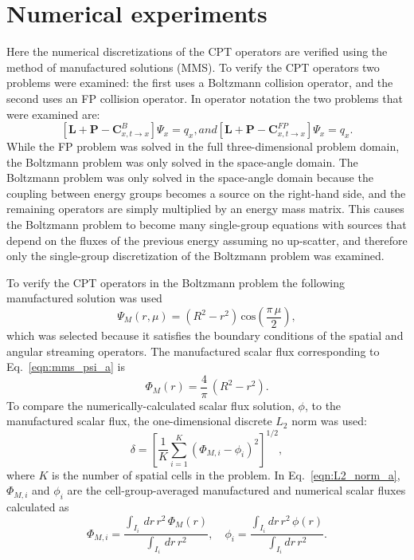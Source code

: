 \documentclass[../main.tex]{subfiles}
\begin{document}
\section{Numerical experiments}
Here the numerical discretizations of the CPT operators are verified using the method of manufactured solutions (MMS). To verify the CPT operators two problems were examined: the first uses a Boltzmann collision operator, and the second uses an FP collision operator. In operator notation the two problems that were examined are:
\begin{subequations} \label{eqn:L2_problems}
  \begin{equation} 
    \left[ \boldsymbol{L} + \boldsymbol{P} - \boldsymbol{C}^B_{x,t\rightarrow x} \right] \Psi_x = q_x,
  \end{equation}
  and
  \begin{equation}
    \left[ \boldsymbol{L} + \boldsymbol{P} - \boldsymbol{C}^{FP}_{x,t\rightarrow x} \right] \Psi_x = q_x.
  \end{equation}
\end{subequations}
While the FP problem was solved in the full three-dimensional problem domain, the Boltzmann problem was only solved in the space-angle domain. The Boltzmann problem was only solved in the space-angle domain because the coupling between energy groups becomes a source on the right-hand side, and the remaining operators are simply multiplied by an energy mass matrix. This causes the Boltzmann problem to become many single-group equations with sources that depend on the fluxes of the previous energy assuming no up-scatter, and therefore only the single-group discretization of the Boltzmann problem was examined.

To verify the CPT operators in the Boltzmann problem the following manufactured solution was used
\begin{equation} \label{eqn:mms_psi_a}
  \Psi_M(r,\mu) = \left( R^2 - r^2 \right) \, \text{cos}\left(\frac{\pi \, \mu}{2}\right),
\end{equation}
which was selected because it satisfies the boundary conditions of the spatial and angular streaming operators. The manufactured scalar flux corresponding to Eq.~\eqref{eqn:mms_psi_a} is
\begin{equation}
  \Phi_M(r) = \dfrac{4}{\pi} \, \left( R^2 - r^2 \right).
\end{equation}
To compare the numerically-calculated scalar flux solution, $\phi$, to the manufactured scalar flux, the one-dimensional discrete $L_2$ norm was used:
\begin{equation} \label{eqn:L2_norm_a}
  \delta = \left[ \dfrac{1}{K} \sum_{i=1}^K \left(\Phi_{M,i} - \phi_{i} \right)^2 \right]^{1/2},
\end{equation}
where $K$ is the number of spatial cells in the problem. In Eq.~\eqref{eqn:L2_norm_a}, $\Phi_{M,i}$ and $\phi_{i}$ are the cell-group-averaged manufactured and numerical scalar fluxes calculated as
\begin{equation}
  \Phi_{M,i} = \frac{ \int_{I_i} \, dr \, r^2 \, \Phi_M(r) }{ \int_{I_i} \, dr \, r^2  }, \quad \phi_{i} = \frac{ \int_{I_i} dr \, r^2 \, \phi(r) }{ \int_{I_i} dr \, r^2 }.
\end{equation}
\end{document}
